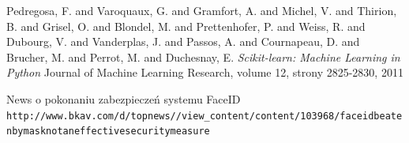 \documentclass[oneside, eng]{mgr}
\begin{document}
\begin{thebibliography}{9}
Pedregosa, F. and Varoquaux, G. and Gramfort, A. and Michel, V.
         and Thirion, B. and Grisel, O. and Blondel, M. and Prettenhofer, P.
         and Weiss, R. and Dubourg, V. and Vanderplas, J. and Passos, A. and
         Cournapeau, D. and Brucher, M. and Perrot, M. and Duchesnay, E.
 \textit{Scikit-learn: Machine Learning in {P}ython}
 Journal of Machine Learning Research, volume 12, strony 2825-2830, 2011

News o pokonaniu zabezpieczeń systemu FaceID
\\\texttt{http://www.bkav.com/d/top\-news/\-/view\_content/content/103968/face\-id\-beaten\-by\-mask\-not\-an\-effective\-security\-measure}

\end{thebibliography}

\tableofcontents

\listoffigures
\end{document}
